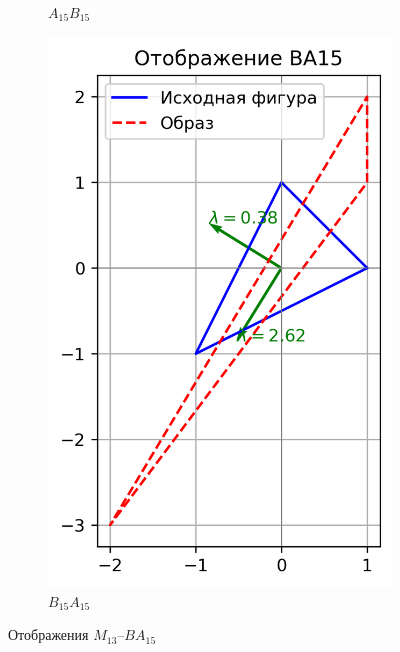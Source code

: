 \begin{figure}[H]
\begin{subfigure}[b]{0.3\textwidth}
    \caption{$A_{15}B_{15}$}
  \end{subfigure}\hfill
  \begin{subfigure}[b]{0.3\textwidth}
    \includegraphics[width=\linewidth]{plots/BA15.png}
    \caption{$B_{15}A_{15}$}
  \end{subfigure}
  \caption{Отображения $M_{13}$–$BA_{15}$}
\end{figure}

\clearpage

